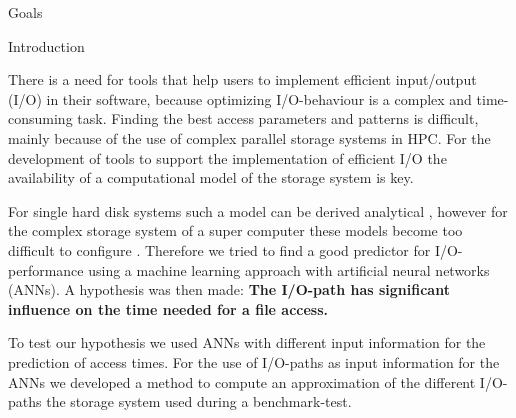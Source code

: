 \documentclass[final]{beamer}
\newlength{\onecolwid}
\begin{document}
\begin{frame}[t]
\begin{columns}[t]
\begin{column}{\onecolwid}
\begin{alertblock}{Goals}
\end{alertblock}


\begin{block}{Introduction}
	
There is a need for tools that help users to implement efficient input/output (I/O) in their software, because optimizing I/O-behaviour is a complex and time-consuming task.
Finding the best access parameters and patterns is difficult, mainly because of the use of complex parallel storage systems in HPC.
For the development of tools to support the implementation of efficient I/O the availability of a computational model of the storage system is key.\medskip

For single hard disk systems such a model can be derived analytical \cite{Ruemmler94anintroduction}, however for the complex storage system of a super computer these models become too difficult to configure \cite{DBLP:conf/npc/ZhangLZJC10}.
Therefore we tried to find a good predictor for I/O-performance using a machine learning approach with artificial neural networks (ANNs).
A hypothesis was then made: \textbf{The I/O-path has significant influence on the time needed for a file access.}\medskip

To test our hypothesis we used ANNs with different input information for the prediction of access times.
For the use of I/O-paths as input information for the ANNs we developed a method to compute an approximation of the different I/O-paths the storage system used during a benchmark-test.

\end{block}





\end{column}
\end{columns}
\end{frame}
\end{document}
